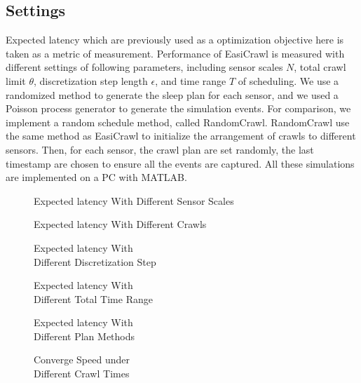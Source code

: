 \documentclass[conference]{IEEEtran}
\begin{document}
\subsection{Settings}
Expected latency which are previously used as a optimization objective here is taken as a metric of measurement.
Performance of EasiCrawl is measured with different settings of following parameters, including sensor scales $N$, total crawl limit $\theta$, discretization step length $\epsilon$, and time range $T$ of scheduling. 
We use a randomized method to generate the sleep plan for each sensor, and we used a Poisson process generator to generate the simulation events.
For comparison, we implement a random schedule method, called RandomCrawl. 
RandomCrawl use the same method as EasiCrawl to initialize the arrangement of crawls to different sensors. 
Then, for each sensor, the crawl plan are set randomly, the last timestamp are chosen to ensure all the events are captured. 
All these simulations are implemented on a PC with MATLAB.
\begin{figure*}
		
		\captionsetup{justification=centering}
		\caption{Expected latency With Different Sensor Scales}
		\label{fig:test1_sensorscale}
	\endminipage\hfill
		
		\captionsetup{justification=centering}
		\caption{Expected latency With Different Crawls}
		\label{fig:test2_totalcrawl}
	\endminipage\hfill
		
		\captionsetup{justification=centering}
		\caption{Expected latency With \\Different Discretization Step}
		\label{fig:test3_discretestep}
	\endminipage
	
		
		\captionsetup{justification=centering}
		\caption{Expected latency With \\Different Total Time Range}
		\label{fig:test4_timerange}
	\endminipage\hfill
		
		\captionsetup{justification=centering}
		\caption{Expected latency With \\Different Plan Methods}
		\label{fig:test5_sensortype}
	\endminipage\hfill
		
		\captionsetup{justification=centering}
		\caption{Converge Speed under \\Different Crawl Times}
		\label{fig:test6_convergespeed}
	\endminipage	
	\vspace{-1.0em}
\end{figure*}
\end{document}
